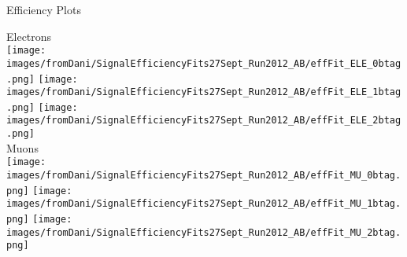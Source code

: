 \documentclass{beamer}
\begin{document}
\begin{frame}{Efficiency Plots}
  \begin{center}
    Electrons\\
    \texttt{[image: images/fromDani/SignalEfficiencyFits27Sept\_Run2012\_AB/effFit\_ELE\_0btag.png]}
    \texttt{[image: images/fromDani/SignalEfficiencyFits27Sept\_Run2012\_AB/effFit\_ELE\_1btag.png]}
    \texttt{[image: images/fromDani/SignalEfficiencyFits27Sept\_Run2012\_AB/effFit\_ELE\_2btag.png]}\\
    Muons\\
    \texttt{[image: images/fromDani/SignalEfficiencyFits27Sept\_Run2012\_AB/effFit\_MU\_0btag.png]}
    \texttt{[image: images/fromDani/SignalEfficiencyFits27Sept\_Run2012\_AB/effFit\_MU\_1btag.png]}
    \texttt{[image: images/fromDani/SignalEfficiencyFits27Sept\_Run2012\_AB/effFit\_MU\_2btag.png]}
\end{center}
\end{frame}
\end{document}
